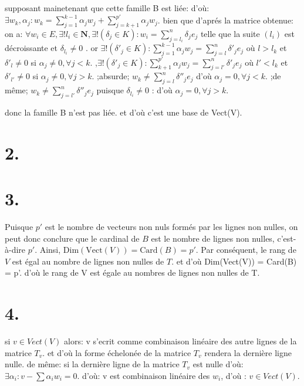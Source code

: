 \documentclass{article}
\begin{document}
supposant mainetenant que cette famille B est liée:\newline
d'où: $\exists{w_k},\alpha_j: w_k = \sum_{j=1}^{k-1} \alpha_jw_j +\sum_{j=k+1}^{p'} \alpha_jw_j$.\newline
bien que d'aprés la matrice obtenue: on a: \newline
$\forall{w_i}\in{E},\exists{!l_i\in\mathbf N},\exists!(\delta_j\in{K}): w_i = \sum_{j=l_i}^{n}\delta_j e_j$ telle que la suite $(l_i)$ est décroissante et $\delta_{l_i}\neq 0$ .\newline
or $\exists!(\delta'_j\in{K}) : \sum_{j=1}^{k-1} \alpha_j w_j = \sum_{j=l}^{n}\delta'_je_j$ où $l>l_k$ et $\delta'_{l} \neq 0$ si $\alpha_j \neq 0,\forall j<k$.\newline
,$\exists!(\delta'_j\in{K}) : \sum_{k+1}^{p'} \alpha_j w_j = \sum_{j=l'}^{n}\delta'_je_j$ où $l'<l_k$ et $\delta'_{l'} \neq 0$ si $\alpha_j \neq 0,\forall j>k$.\newline
;absurde; $w_k \neq \sum_{j=l}^{n}\delta''_je_j$ d'où $\alpha_j = 0,\forall j<k$.\newline
;de même; $w_k \neq \sum_{j=l'}^{n}\delta''_je_j$  puisque $\delta_{l_i}\neq 0$ :  d'où $\alpha_j = 0,\forall j>k$.\newline\newline

donc la famille B n'est pas liée. et d'où c'est une base de Vect(V).

\section*{2.}

\section*{3.}
Puisque $p'$ est le nombre de vecteurs non nuls formés par les lignes non nulles, on peut donc conclure que le cardinal de $B$ est le nombre de lignes non nulles, c'est-à-dire $p'$. Ainsi, $\text{Dim}(\text{Vect}(V)) = \text{Card}(B) = p'$. Par conséquent, le rang de $V$ est égal au nombre de lignes non nulles de $T$.
et d'où Dim(Vect(V)) = Card(B) = p'. d'où le rang de V est égale au nombres de lignes non nulles de T.

\section*{4.}


si $v \in Vect(V)$ alors: v s'ecrit comme combinaison linéaire des autre lignes de la matrice $T_v$.\newline
et d'où la forme échelonée de la matrice $T_v$ rendera la dernière ligne nulle.\newline
de même: si la dernière ligne de la matrice $T_v$ est nulle d'où: $\exists\alpha_i : v - \sum\alpha_iw_i = 0$.\newline
d'où: v est combinaison linéaire des $w_i$, d'où : $v \in Vect(V)$.
\end{document}
